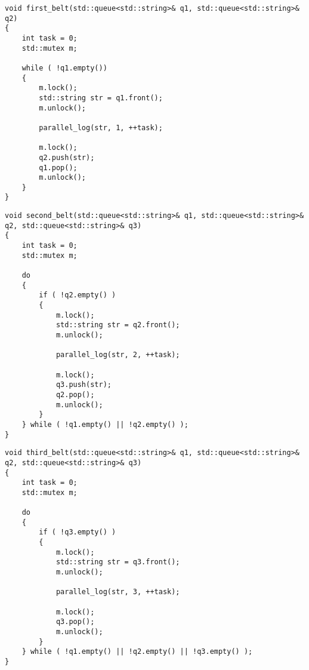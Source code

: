 \clearpage
\begin{center}
    \captionsetup{justification=raggedright,singlelinecheck=off}
    \begin{lstlisting}[label=lst:first,caption=Алгоритм работы первой ленты]
void first_belt(std::queue<std::string>& q1, std::queue<std::string>& q2)
{
    int task = 0;
    std::mutex m;

    while ( !q1.empty())
    {
        m.lock();
        std::string str = q1.front();
        m.unlock();

        parallel_log(str, 1, ++task);

        m.lock();
        q2.push(str);
        q1.pop();
        m.unlock();
    }
}
\end{lstlisting}
\end{center}
\clearpage
\begin{center}
    \captionsetup{justification=raggedright,singlelinecheck=off}
    \begin{lstlisting}[label=lst:second,caption=Алгоритм работы второй ленты]
void second_belt(std::queue<std::string>& q1, std::queue<std::string>& q2, std::queue<std::string>& q3)
{
    int task = 0;
    std::mutex m;

    do
    {
        if ( !q2.empty() )
        {
            m.lock();
            std::string str = q2.front();
            m.unlock();

            parallel_log(str, 2, ++task);

            m.lock();
            q3.push(str);
            q2.pop();
            m.unlock();
        }
    } while ( !q1.empty() || !q2.empty() );
}
\end{lstlisting}
\end{center}
\clearpage
\begin{center}
    \captionsetup{justification=raggedright,singlelinecheck=off}
    \begin{lstlisting}[label=lst:third,caption=Алгоритм работы третьей ленты]
void third_belt(std::queue<std::string>& q1, std::queue<std::string>& q2, std::queue<std::string>& q3)
{
    int task = 0;
    std::mutex m;

    do
    {
        if ( !q3.empty() )
        {
            m.lock();
            std::string str = q3.front();
            m.unlock();

            parallel_log(str, 3, ++task);

            m.lock();
            q3.pop();
            m.unlock();
        }
    } while ( !q1.empty() || !q2.empty() || !q3.empty() );
}
\end{lstlisting}
\end{center}

